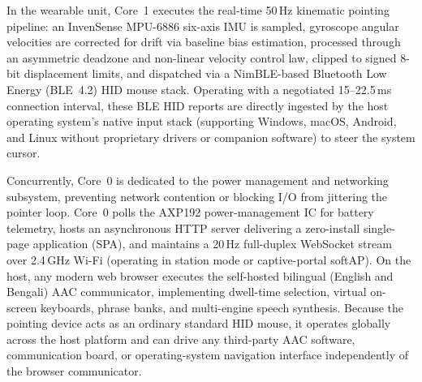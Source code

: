 \documentclass[journal]{IEEEtran}
\begin{document}
In the wearable unit, Core~1 executes the real-time 50\,Hz kinematic pointing pipeline: an InvenSense MPU-6886 six-axis IMU is sampled, gyroscope angular velocities are corrected for drift via baseline bias estimation, processed through an asymmetric deadzone and non-linear velocity control law, clipped to signed 8-bit displacement limits, and dispatched via a NimBLE-based Bluetooth Low Energy (BLE~4.2) HID mouse stack. Operating with a negotiated 15--22.5\,ms connection interval, these BLE HID reports are directly ingested by the host operating system's native input stack (supporting Windows, macOS, Android, and Linux without proprietary drivers or companion software) to steer the system cursor.

Concurrently, Core~0 is dedicated to the power management and networking subsystem, preventing network contention or blocking I/O from jittering the pointer loop. Core~0 polls the AXP192 power-management IC for battery telemetry, hosts an asynchronous HTTP server delivering a zero-install single-page application (SPA), and maintains a 20\,Hz full-duplex WebSocket stream over 2.4\,GHz Wi-Fi (operating in station mode or captive-portal softAP). On the host, any modern web browser executes the self-hosted bilingual (English and Bengali) AAC communicator, implementing dwell-time selection, virtual on-screen keyboards, phrase banks, and multi-engine speech synthesis. Because the pointing device acts as an ordinary standard HID mouse, it operates globally across the host platform and can drive any third-party AAC software, communication board, or operating-system navigation interface independently of the browser communicator.
\end{document}
